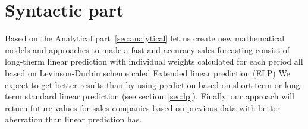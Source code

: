 
\chapter{Syntactic part} \label{sec:methodology}
Based on the Analytical part~\ref{sec:analytical} let us create new mathematical models and approaches to made a fast and accuracy sales forcasting
consist of long-therm linear prediction with individual weights calculated for each period all based on Levinson-Durbin scheme caled Extended linear prediction (ELP)
We expect to get better results than by using prediction based on short-term or long-term standard linear prediction (see section~\ref{sec:lp}).
Finally, our approach will return future values for sales companies based on previous data with better aberration than linear prediction has.